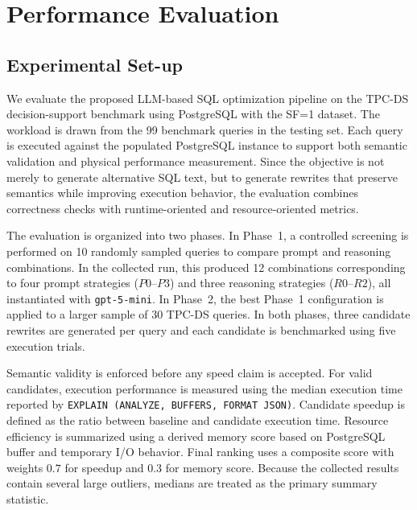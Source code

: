 
\section{Performance Evaluation}
\label{sec:performance}

\subsection{Experimental Set-up}

We evaluate the proposed LLM-based SQL optimization pipeline on the TPC-DS decision-support benchmark using PostgreSQL with the SF=1 dataset. The workload is drawn from the 99 benchmark queries in the testing set. Each query is executed against the populated PostgreSQL instance to support both semantic validation and physical performance measurement. Since the objective is not merely to generate alternative SQL text, but to generate rewrites that preserve semantics while improving execution behavior, the evaluation combines correctness checks with runtime-oriented and resource-oriented metrics.

The evaluation is organized into two phases. In Phase~1, a controlled screening is performed on 10 randomly sampled queries to compare prompt and reasoning combinations. In the collected run, this produced 12 combinations corresponding to four prompt strategies ($P0$--$P3$) and three reasoning strategies ($R0$--$R2$), all instantiated with \texttt{gpt-5-mini}. In Phase~2, the best Phase~1 configuration is applied to a larger sample of 30 TPC-DS queries. In both phases, three candidate rewrites are generated per query and each candidate is benchmarked using five execution trials.

Semantic validity is enforced before any speed claim is accepted. For valid candidates, execution performance is measured using the median execution time reported by \texttt{EXPLAIN (ANALYZE, BUFFERS, FORMAT JSON)}. Candidate speedup is defined as the ratio between baseline and candidate execution time. Resource efficiency is summarized using a derived memory score based on PostgreSQL buffer and temporary I/O behavior. Final ranking uses a composite score with weights $0.7$ for speedup and $0.3$ for memory score. Because the collected results contain several large outliers, medians are treated as the primary summary statistic.

